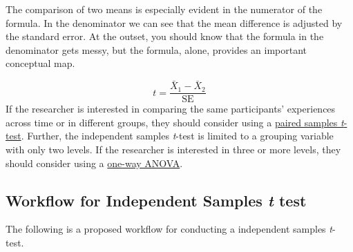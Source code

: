 \documentclass[
  11pt,
]{book}
\begin{document}
The comparison of two means is especially evident in the numerator of the formula. In the denominator we can see that the mean difference is adjusted by the standard error. At the outset, you should know that the formula in the denominator gets messy, but the formula, alone, provides an important conceptual map.

\[t = \frac{\bar{X}_1 - \bar{X}_2}{\mbox{SE}}\]
If the researcher is interested in comparing the same participants' experiences across time or in different groups, they should consider using a \protect\hyperlink{tPaired}{paired samples \emph{t}-test}. Further, the independent samples \emph{t}-test is limited to a grouping variable with only two levels. If the researcher is interested in three or more levels, they should consider using a \protect\hyperlink{oneway}{one-way ANOVA}.

\hypertarget{workflow-for-independent-samples-t-test}{%
\subsection{\texorpdfstring{Workflow for Independent Samples \emph{t} test}{Workflow for Independent Samples t test}}\label{workflow-for-independent-samples-t-test}}

The following is a proposed workflow for conducting a independent samples \emph{t}-test.
\end{document}
